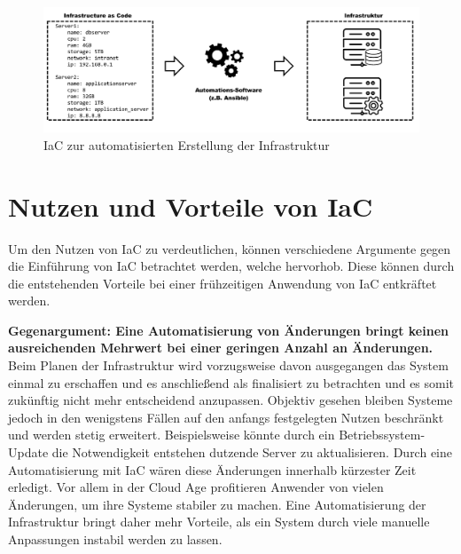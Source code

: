 \documentclass[biblatex]{lni}
\begin{document}
\begin{figure}
    \centering
    \includegraphics[width=12cm]{iac-scheme.png}
    \caption{IaC zur automatisierten Erstellung der Infrastruktur}
    \label{fig:iacschemata}
\end{figure}

\section{Nutzen und Vorteile von IaC}
Um den Nutzen von IaC zu verdeutlichen, können verschiedene Argumente gegen die Einführung von IaC betrachtet werden, welche \cite{Morris.December2020} hervorhob. Diese können durch die entstehenden Vorteile bei einer frühzeitigen Anwendung von IaC entkräftet werden. 

\textbf{Gegenargument: Eine Automatisierung von Änderungen bringt keinen ausreichenden Mehrwert bei einer geringen Anzahl an Änderungen.}\\
Beim Planen der Infrastruktur wird vorzugsweise davon ausgegangen das System einmal zu erschaffen und es anschließend als finalisiert zu betrachten und es somit zukünftig nicht mehr entscheidend anzupassen. Objektiv gesehen bleiben Systeme jedoch in den wenigstens Fällen auf den anfangs festgelegten Nutzen beschränkt und werden stetig erweitert. Beispielsweise könnte durch ein Betriebssystem-Update die Notwendigkeit entstehen dutzende Server zu aktualisieren. Durch eine Automatisierung mit IaC wären diese Änderungen innerhalb kürzester Zeit erledigt. Vor allem in der Cloud Age profitieren Anwender von vielen Änderungen, um ihre Systeme stabiler zu machen. Eine Automatisierung der Infrastruktur bringt daher mehr Vorteile, als ein System durch viele manuelle Anpassungen instabil werden zu lassen.   
\end{document}
